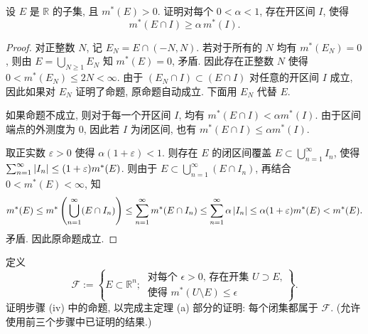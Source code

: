 \documentclass{article}
\begin{document}
\begin{problem}
  设 $E$ 是 $\mathbb{R}$ 的子集, 且 $m^*(E)>0$. 证明对每个 $0<\alpha<1$, 存在开区间 $I$, 使得
  \[
    m^*(E\cap I)\geq\alpha\,m^*(I).
  \]
\end{problem}

\begin{proof}
	对正整数 $N$, 记 $E_N = E \cap (-N, N)$. 若对于所有的 $N$ 均有 $m^*(E_N) = 0$, 则由 $E = \bigcup_{N \ge 1}^{}E_N$ 知 $m^*(E) = 0$, 矛盾. 因此存在正整数 $N$ 使得 $0 < m^*(E_N) \le 2N <\infty$. 由于 $(E_N \cap I) \subset (E \cap I)$ 对任意的开区间 $I$ 成立, 因此如果对 $E_N$ 证明了命题, 原命题自动成立. 下面用 $E_N$ 代替 $E$.

	如果命题不成立, 则对于每一个开区间 $I$, 均有 $m^*(E \cap I) < \alpha m^*(I)$. 由于区间端点的外测度为 $0$, 因此若 $I$ 为闭区间, 也有 $m^*(E \cap I) \le \alpha m^*(I)$.
	
	取正实数 $\varepsilon>0$ 使得 $\alpha(1 + \varepsilon) < 1$. 则存在 $E$ 的闭区间覆盖 $E \subset \bigcup_{n=1}^{\infty} I_n$, 使得 $\sum_{n=1}^{\infty} \left|I_n\right| \le (1 + \varepsilon) m^*(E)$. 则由于 $E \subset \bigcup_{n=1}^{\infty} (E \cap I_n)$, 再结合 $0 < m^*(E) < \infty$, 知
	\[ m^*(E) \le m^* \left( \bigcup_{n=1}^{\infty} (E \cap I_n) \right)
	\le \sum_{n=1}^{\infty}m^*(E \cap I_n)
	\le \sum_{n=1}^{\infty}\alpha \left|I_n\right|
	\le \alpha(1 + \varepsilon) m^*(E) < m^*(E). \]
	矛盾. 因此原命题成立.
\end{proof}



\begin{problem}
  定义
  \[
    \mathcal{F}:=\left\{E\subset\mathbb{R}^n;\ \begin{gathered}
      \text{对每个 $\epsilon>0$, 存在开集 $U\supset E$,}\\
      \text{使得 $m^*(U\setminus E)\leq\epsilon$}
    \end{gathered}\right\}.
  \]
  证明步骤 (iv) 中的命题, 以完成主定理 (a) 部分的证明: 每个闭集都属于 $\mathcal{F}$. (允许使用前三个步骤中已证明的结果.)
\end{problem}
\end{document}
